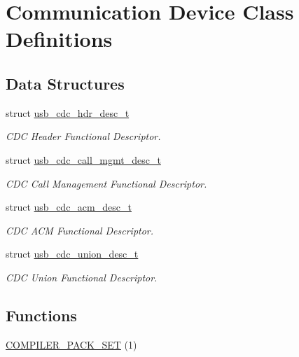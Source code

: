 \hypertarget{group__cdc__protocol__group}{
\section{\-Communication \-Device \-Class \-Definitions}
\label{group__cdc__protocol__group}
}
\subsection*{\-Data \-Structures}
\begin{DoxyCompactItemize}
\item 
struct \hyperlink{structusb__cdc__hdr__desc__t}{usb\-\_\-cdc\-\_\-hdr\-\_\-desc\-\_\-t}
\begin{DoxyCompactList}\small\item\em \-C\-D\-C \-Header \-Functional \-Descriptor. \end{DoxyCompactList}\item 
struct \hyperlink{structusb__cdc__call__mgmt__desc__t}{usb\-\_\-cdc\-\_\-call\-\_\-mgmt\-\_\-desc\-\_\-t}
\begin{DoxyCompactList}\small\item\em \-C\-D\-C \-Call \-Management \-Functional \-Descriptor. \end{DoxyCompactList}\item 
struct \hyperlink{structusb__cdc__acm__desc__t}{usb\-\_\-cdc\-\_\-acm\-\_\-desc\-\_\-t}
\begin{DoxyCompactList}\small\item\em \-C\-D\-C \-A\-C\-M \-Functional \-Descriptor. \end{DoxyCompactList}\item 
struct \hyperlink{structusb__cdc__union__desc__t}{usb\-\_\-cdc\-\_\-union\-\_\-desc\-\_\-t}
\begin{DoxyCompactList}\small\item\em \-C\-D\-C \-Union \-Functional \-Descriptor. \end{DoxyCompactList}\end{DoxyCompactItemize}
\subsection*{\-Functions}
\begin{DoxyCompactItemize}
\item 
\hyperlink{group__cdc__protocol__group_ga14096700b3ed8c5168615c5c5ee1c68d}{\-C\-O\-M\-P\-I\-L\-E\-R\-\_\-\-P\-A\-C\-K\-\_\-\-S\-E\-T} (1)
\end{DoxyCompactItemize}
